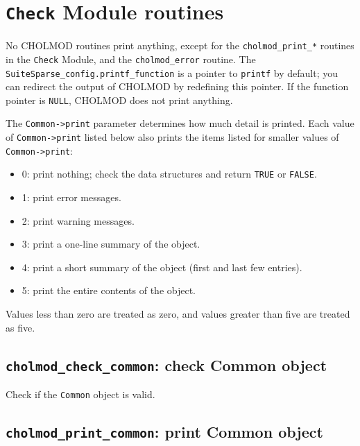 \documentclass[11pt]{article}
\begin{document}
\newpage \section{{\tt Check} Module routines}

No CHOLMOD routines print anything, except for the {\tt cholmod\_print\_*}
routines in the {\tt Check} Module, and the {\tt cholmod\_error} routine.  The
{\tt SuiteSparse\_config.printf\_function} is a pointer to {\tt printf} by default;
you can redirect the output of CHOLMOD by redefining this pointer.
If the function pointer is {\tt NULL}, CHOLMOD does not print anything.

The {\tt Common->print} parameter determines how much detail is printed.
Each value of {\tt Common->print} listed below also prints the items listed
for smaller values of {\tt Common->print}:
\begin{itemize}
\item 0: print nothing; check the data structures and return {\tt TRUE} or {\tt FALSE}.
\item 1: print error messages.
\item 2: print warning messages.
\item 3: print a one-line summary of the object.
\item 4: print a short summary of the object (first and last few entries).
\item 5: print the entire contents of the object.
\end{itemize}
Values less than zero are treated as zero, and values greater than five are
treated as five.

\subsection{{\tt cholmod\_check\_common}: check Common object}


Check if the {\tt Common} object is valid.

\subsection{{\tt cholmod\_print\_common}: print Common object}
\end{document}
